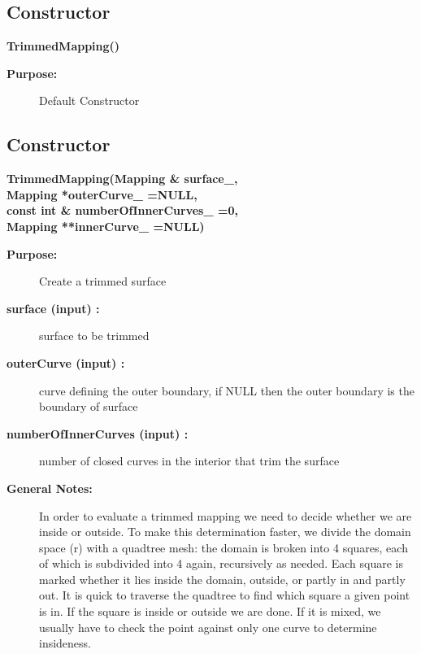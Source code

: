 \subsection{Constructor}
 
\newlength{\TrimmedMappingIncludeArgIndent}
\begin{flushleft} \textbf{%
\settowidth{\TrimmedMappingIncludeArgIndent}{TrimmedMapping(}%
TrimmedMapping() 
}\end{flushleft}
\begin{description}
\item[{\bf Purpose:}]  Default Constructor
\end{description}
\subsection{Constructor}
 
\begin{flushleft} \textbf{%
\settowidth{\TrimmedMappingIncludeArgIndent}{TrimmedMapping(}%
TrimmedMapping(Mapping \& surface\_, \\ 
\hspace{\TrimmedMappingIncludeArgIndent}Mapping *outerCurve\_  =NULL, \\ 
\hspace{\TrimmedMappingIncludeArgIndent}const int \& numberOfInnerCurves\_  =0, \\ 
\hspace{\TrimmedMappingIncludeArgIndent}Mapping **innerCurve\_  =NULL)
}\end{flushleft}
\begin{description}
\item[{\bf Purpose:}]  Create a trimmed surface
\item[{\bf surface (input) :}]  surface to be trimmed
\item[{\bf outerCurve (input) :}]  curve defining the outer boundary, if NULL then the 
   outer boundary is the boundary of surface
\item[{\bf numberOfInnerCurves (input) :}]  number of closed curves in the interior that trim
    the surface
\item[{\bf General Notes:}] 
    In order to evaluate a trimmed mapping we need to decide whether we are inside or outside.
  To make this determination faster, we divide the domain space (r) with a quadtree mesh:
 the domain is broken into 4 squares, each of which is subdivided into 4 again, recursively
 as needed.  Each square is marked whether it lies inside the domain, outside, or partly in
 and partly out.  It is quick to traverse the quadtree to find which square a given point is
 in.  If the square is inside or outside we are done.  If it is mixed, we usually have to
 check the point against only one curve to determine insideness.

\end{description}
